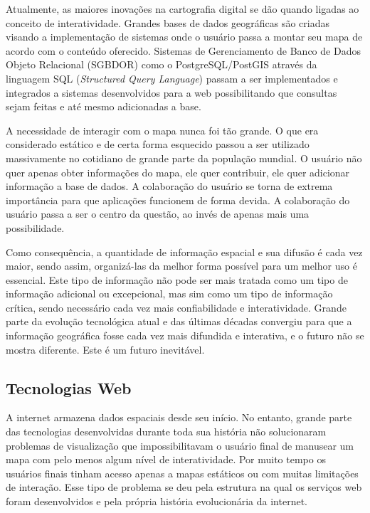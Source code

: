 		Atualmente, as maiores inovações na cartografia digital se dão quando ligadas ao conceito de interatividade. Grandes bases de dados geográficas são criadas visando a implementação de sistemas onde o usuário passa a montar seu mapa de acordo com o conteúdo oferecido. Sistemas de Gerenciamento de Banco de Dados Objeto Relacional (SGBDOR) como o PostgreSQL/PostGIS através da linguagem SQL (\textit{Structured Query Language}) passam a ser implementados e integrados a sistemas desenvolvidos para a web possibilitando que consultas sejam feitas e até mesmo adicionadas a base.
		
		A necessidade de interagir com o mapa nunca foi tão grande. O que era considerado estático e de certa forma esquecido passou a ser utilizado massivamente no cotidiano de grande parte da população mundial. O usuário não quer apenas obter informações do mapa, ele quer contribuir, ele quer adicionar informação a base de dados. A colaboração do usuário se torna de extrema importância para que aplicações funcionem de forma devida. A colaboração do usuário passa a ser o centro da questão, ao invés de apenas mais uma possibilidade.
		
		Como consequência, a quantidade de informação espacial e sua difusão é cada vez maior, sendo assim, organizá-las da melhor forma possível para um melhor uso é essencial. Este tipo de informação não pode ser mais tratada como um tipo de informação adicional ou excepcional, mas sim como um tipo de informação crítica, sendo necessário cada vez mais confiabilidade e interatividade. Grande parte da evolução tecnológica atual e das últimas décadas convergiu para que a informação geográfica fosse cada vez mais difundida e interativa, e o futuro não se mostra diferente. Este é um futuro inevitável. 
		
		\subsection{Tecnologias Web}
		
		A internet armazena dados espaciais desde seu início. No entanto, grande parte das tecnologias desenvolvidas durante toda sua história não solucionaram problemas de visualização que impossibilitavam o usuário final de manusear um mapa com pelo menos algum nível de interatividade. Por muito tempo os usuários finais tinham acesso apenas a mapas estáticos ou com muitas limitações de interação. Esse tipo de problema se deu pela estrutura na qual os serviços web foram desenvolvidos e pela própria história evolucionária da internet. 
		
